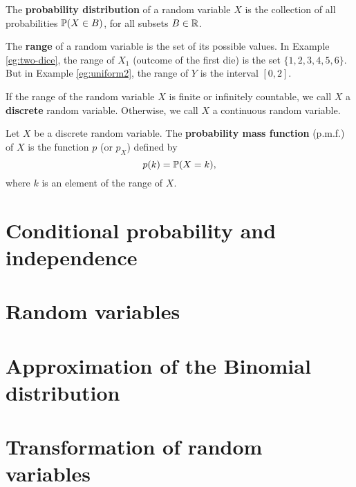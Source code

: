   \begin{definition}
    The \textbf{probability distribution} of a random variable $X$ is the
    collection of all probabilities $\mathbb{P}(X\in B)$, for all subsets $B\in \mathbb{R}$.
  \end{definition}
  The \textbf{range} of a random variable is the set of its possible values. In
  Example \ref{eg:two-dice}, the range of $X_1$ (outcome of the first die) is
  the set $\{1,2,3,4,5,6\}$. But in Example \ref{eg:uniform2}, the range of $Y$
  is the interval $[0,2]$.
  \begin{definition}
   If the range of the random variable $X$ is finite or infinitely countable, we
   call $X$ a \textbf{discrete} random variable. Otherwise, we call $X$ a
   continuous random variable.
  \end{definition}
  \begin{definition}
    Let $X$ be a discrete random variable. The \textbf{probability mass
      function} (p.m.f.) of $X$ is the function $p$ (or $p_X$) defined by
    \[
      p(k) = \mathbb{P}(X = k),
    \]
    where $k$ is an element of the range of $X$.
  \end{definition}
  

\section{Conditional probability and independence}
\label{sec:cond-prob-indep}


\section{Random variables}
\label{sec:random-variables}


\section{Approximation of the Binomial distribution}
\label{sec:appr-binom-distr}


\section{Transformation of random variables}
\label{sec:transf-rand-vari}

